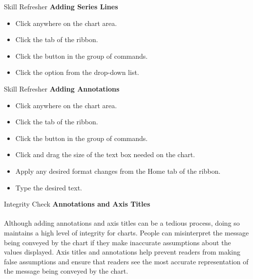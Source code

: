 \begin{center}
	\begin{sklbox}{Skill Refresher}
		\textbf{Adding Series Lines}
		\\
		\begin{itemize}
			\setlength{\itemsep}{0pt}
			\setlength{\parskip}{0pt}
			\setlength{\parsep}{0pt}
			
			\item Click anywhere on the chart area.
			\item Click the  tab of the ribbon.
			\item Click the  button in the  group of commands.
			\item Click the  option from the drop-down list.
			
		\end{itemize}
	\end{sklbox}
\end{center}

\begin{center}
	\begin{sklbox}{Skill Refresher}
		\textbf{Adding Annotations}
		\\
		\begin{itemize}
			\setlength{\itemsep}{0pt}
			\setlength{\parskip}{0pt}
			\setlength{\parsep}{0pt}
			
			\item Click anywhere on the chart area.
			\item Click the  tab of the ribbon.
			\item Click the  button in the  group of commands.
			\item Click and drag the size of the text box needed on the chart.
			\item Apply any desired format changes from the Home tab of the ribbon.
			\item Type the desired text.
			
		\end{itemize}
	\end{sklbox}
\end{center}

\begin{center}
	\begin{infobox}{Integrity Check}
		\textbf{Annotations and Axis Titles}
		\\
		\\
		Although adding annotations and axis titles can be a tedious process, doing so maintains a high level of integrity for charts. People can misinterpret the message being conveyed by the chart if they make inaccurate assumptions about the values displayed. Axis titles and annotations help prevent readers from making false assumptions and ensure that readers see the most accurate representation of the message being conveyed by the chart.		
	\end{infobox}
\end{center}

